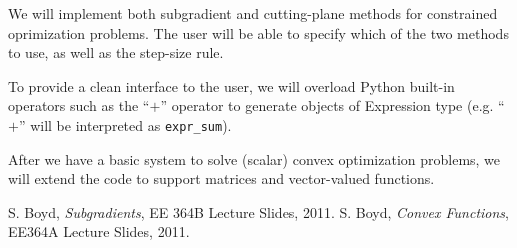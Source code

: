 \documentclass[12pt]{article}
\begin{document}
\item We will implement both subgradient and cutting-plane methods for constrained oprimization problems. The user will be able to specify which of the two methods to use, as well as the step-size rule.

\item To provide a clean interface to the user, we will overload Python built-in operators such as the ``$+$'' operator to generate objects of Expression type (e.g. ``$+$'' will be interpreted as \verb'expr_sum').

\EIT

After we have a basic system to solve (scalar) convex optimization problems, we will extend the code to support matrices and vector-valued functions. 


\begin{thebibliography}{99}
 S. Boyd, \emph{Subgradients}, EE 364B Lecture Slides, 2011.
 S. Boyd, \emph{Convex Functions}, EE364A Lecture Slides, 2011.
\end{thebibliography}
\end{document}
